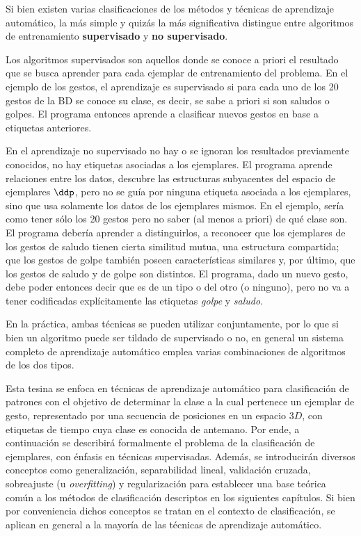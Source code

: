 
Si bien existen varias clasificaciones de los métodos y técnicas de aprendizaje automático, la más simple y quizás la más significativa distingue entre algoritmos de entrenamiento \textbf{supervisado} y \textbf{no supervisado}. 

Los algoritmos supervisados son aquellos donde se conoce a priori el resultado que se busca aprender para cada ejemplar de entrenamiento del problema. En el ejemplo de los gestos, el aprendizaje es supervisado si para cada uno de los 20 gestos de la BD se conoce su clase, es decir, se sabe a priori si son saludos o golpes. El programa entonces aprende a clasificar nuevos gestos en base a etiquetas anteriores.

En el aprendizaje no supervisado no hay o se ignoran los resultados previamente conocidos, no hay etiquetas asociadas a los ejemplares. El programa aprende relaciones entre los datos, descubre las estructuras subyacentes del espacio de ejemplares $\ddp$, pero no se guía por ninguna etiqueta asociada a los ejemplares, sino que usa solamente los datos de los ejemplares mismos. En el ejemplo, sería como tener sólo los 20 gestos pero no saber (al menos a priori) de qué clase son. El programa debería aprender a distinguirlos, a reconocer que los ejemplares de los gestos de saludo tienen cierta similitud mutua, una estructura compartida; que los gestos de golpe también poseen características similares y, por último, que los gestos de saludo y de golpe son distintos. El programa, dado un nuevo gesto, debe poder entonces decir que es de un tipo o del otro (o ninguno), pero no va a tener codificadas explícitamente las etiquetas \textit{golpe} y \textit{saludo}.


En la práctica, ambas técnicas se pueden utilizar conjuntamente, por lo que si bien un algoritmo puede ser tildado de supervisado o no, en general un sistema completo de aprendizaje automático emplea varias combinaciones de algoritmos de los dos tipos.

Esta tesina se enfoca en técnicas de aprendizaje automático para clasificación de patrones con el objetivo de determinar la clase a la cual pertenece un ejemplar de gesto, representado por una secuencia de posiciones en un espacio $3D$, con etiquetas de tiempo cuya clase es conocida de antemano. Por ende, a continuación se describirá formalmente el problema de la clasificación de ejemplares, con énfasis en técnicas supervisadas. Además, se introducirán diversos conceptos como generalización, separabilidad lineal, validación cruzada, sobreajuste (u \textit{overfitting}) y regularización para establecer una base teórica común a los métodos de clasificación descriptos en los siguientes capítulos. Si bien por conveniencia dichos conceptos se tratan en el contexto de clasificación, se aplican en general a la mayoría de las técnicas de aprendizaje automático.

